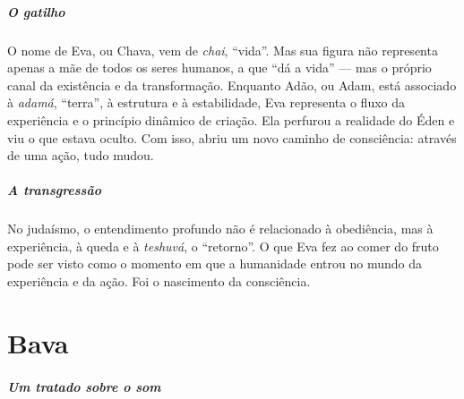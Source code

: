 \paragraph{O gatilho} O nome de Eva, ou Chava, vem de \textit{chai}, ``vida''. Mas sua figura não representa apenas a mãe de todos os seres humanos, a que ``dá a vida'' --- mas o próprio canal da existência e da transformação. Enquanto Adão, ou Adam, está associado à \textit{adamá}, ``terra'', à estrutura e à estabilidade, Eva representa o fluxo da experiência e o princípio dinâmico de criação. Ela perfurou a realidade do Éden e viu o que estava oculto. Com isso, abriu um novo caminho de consciência: através de uma ação, tudo mudou. %

\paragraph{A transgressão} No judaísmo, o entendimento profundo não é relacionado à obediência, mas à experiência, à queda e à \textit{teshuvá}, o ``retorno''. O que Eva fez ao comer do fruto pode ser visto como o momento em que a humanidade entrou no mundo da experiência e da ação. Foi o nascimento da consciência.

\chapter*{Bava \smallskip{}}

\begin{center}
{\huge{}}
\end{center}

\paragraph{Um tratado sobre o som} 

